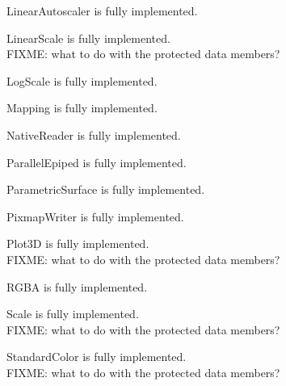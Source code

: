 \documentclass{manual}
\begin{document}
\begin{classdesc*}{LinearAutoscaler}
  is fully implemented.
\end{classdesc*}

\begin{classdesc*}{LinearScale}
  is fully implemented.\\
  FIXME: what to do with the protected data members?
\end{classdesc*}

\begin{classdesc*}{LogScale}
  is fully implemented.
\end{classdesc*}

\begin{classdesc*}{Mapping}
  is fully implemented.
\end{classdesc*}

\begin{classdesc*}{NativeReader}
  is fully implemented.
\end{classdesc*}

\begin{classdesc*}{ParallelEpiped}
  is fully implemented.
\end{classdesc*}

\begin{classdesc*}{ParametricSurface}
  is fully implemented.
\end{classdesc*}

\begin{classdesc*}{PixmapWriter}
  is fully implemented.
\end{classdesc*}

\begin{classdesc*}{Plot3D}
  is fully implemented.\\
  FIXME: what to do with the protected data members?\\
\end{classdesc*}

\begin{classdesc*}{RGBA}
  is fully implemented.
\end{classdesc*}

\begin{classdesc*}{Scale}
  is fully implemented.\\
  FIXME: what to do with the protected data members?
\end{classdesc*}

\begin{classdesc*}{StandardColor}
  is fully implemented.\\
  FIXME: what to do with the protected data members?
\end{classdesc*}
\end{document}
